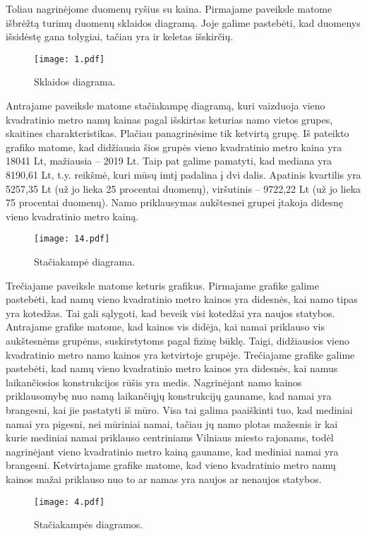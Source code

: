 \documentclass[a4paper]{article}
\begin{document}
\hspace*{0,52cm}Toliau nagrinėjome duomenų ryšius su kaina. Pirmajame paveiksle matome išbrėžtą turimų duomenų sklaidos diagramą. Joje galime pastebėti, kad duomenys išsidėstę gana tolygiai, tačiau yra ir keletas išskirčių.
\begin{figure}[H]
  \caption{Sklaidos diagrama.}
  \centering
    \texttt{[image: 1.pdf]}
\end{figure}

\hspace*{0,52cm}Antrajame paveiksle matome stačiakampę diagramą, kuri vaizduoja vieno kvadratinio metro namų kainas pagal išskirtas keturias namo vietos grupes, skaitines charakteristikas. Plačiau panagrinėsime tik ketvirtą grupę. Iš pateikto grafiko matome, kad didžiausia šios grupės vieno kvadratinio metro kaina yra 18041 Lt, mažiausia -- 2019 Lt. Taip pat galime pamatyti, kad mediana yra 8190,61 Lt, t.y. reikšmė, kuri mūsų imtį padalina į dvi dalis. Apatinis kvartilis yra 5257,35 Lt (už jo lieka 25 procentai duomenų),  viršutinis -- 9722,22 Lt (už jo lieka 75 procentai duomenų). Namo priklausymas aukštesnei grupei įtakoja didesnę vieno kvadratinio metro kainą.
\begin{figure}[H]
  \caption{Stačiakampė diagrama.}
  \centering
    \texttt{[image: 14.pdf]}
\end{figure}

\hspace*{0,52cm}Trečiajame paveiksle matome keturis grafikus. Pirmajame grafike galime pastebėti, kad namų vieno kvadratinio metro kainos yra didesnės, kai namo tipas yra kotedžas. Tai gali sąlygoti, kad beveik visi kotedžai yra naujos statybos. Antrajame grafike matome, kad kainos vis didėja, kai namai priklauso vis aukštesnėms grupėms, suskirstytoms pagal fizinę būklę. Taigi, didžiausios vieno kvadratinio metro namo kainos yra ketvirtoje grupėje. Trečiajame grafike galime pastebėti, kad namų vieno kvadratinio metro kainos yra didesnės, kai namus laikančiosios konstrukcijos rūšis yra medis. Nagrinėjant namo kainos priklausomybę nuo namą laikančiųjų konstrukcijų gauname, kad namai yra brangesni, kai jie pastatyti iš mūro. Visa tai galima paaiškinti tuo, kad mediniai namai yra pigesni, nei mūriniai namai, tačiau jų namo plotas mažesnis ir kai kurie mediniai namai priklauso centriniams Vilniaus miesto rajonams, todėl nagrinėjant vieno kvadratinio metro kainą gauname, kad mediniai namai yra brangesni. Ketvirtajame grafike matome, kad vieno kvadratinio metro namų kainos mažai priklauso nuo to ar namas yra naujos ar nenaujos statybos.
\begin{figure}[H]
  \caption{Stačiakampės diagramos.}
  \centering
    \texttt{[image: 4.pdf]}
\end{figure}
\end{document}
